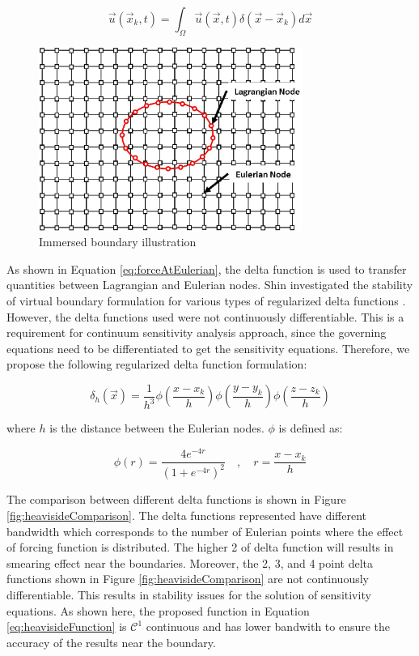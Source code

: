 \documentclass[12pt]{aiaa-pretty}
\begin{document}
%
\begin{equation}\label{eq:velocityAtLagrangian}
	\vec{u}(\vec{x}_k, t) = \int_\Omega \vec{u} (\vec{x}, t) \delta(\vec{x} - \vec{x}_k) d\vec{x}
\end{equation}
%

%
\begin{figure}[H]
	\centering
	\includegraphics[height=6.0cm]{figure/immerdBoundary.jpg}
	\caption{Immersed boundary illustration}
	\label{fig:immersedBoundary}
\end{figure}
%

As shown in Equation \eqref{eq:forceAtEulerian}, the delta function is used to transfer quantities between Lagrangian and Eulerian nodes. Shin investigated the stability of virtual boundary formulation for various types of regularized delta functions \cite{shin2008assessment}. However, the delta functions used were not continuously differentiable. This is a requirement for continuum sensitivity analysis approach, since the governing equations need to be differentiated to get the sensitivity equations. Therefore, we propose the following regularized delta function formulation:

%
\begin{equation}\label{eq:heavisideFunction}
	\delta_h(\vec{x}) = \frac{1}{h^3} \phi \left( \frac{x - x_k}{h} \right)
									 \phi \left( \frac{y - y_k}{h} \right)
									 \phi \left( \frac{z - z_k}{h} \right)
\end{equation}
%

where $h$ is the distance between the Eulerian nodes. $\phi$ is defined as:

%
\begin{equation}\label{eq:continuousDeltaFunction}
	\phi(r) = \frac{4 e^{-4 r}}{\left( 1 + e^{-4 r} \right)^2} \quad , \quad r = \frac{x - x_k}{h}
\end{equation}
%

The comparison between different delta functions is shown in Figure \ref{fig:heavisideComparison}. The delta functions represented have different bandwidth which corresponds to the number of Eulerian points where the effect of forcing function is distributed. The higher 2 of delta function will results in smearing effect near the boundaries. Moreover, the 2, 3, and 4 point delta functions shown in Figure \ref{fig:heavisideComparison} are not continuously differentiable. This results in stability issues for the solution of sensitivity equations. As shown here, the proposed function in Equation \eqref{eq:heavisideFunction} is $\mathcal{C}^1$ continuous and has lower bandwith to ensure the accuracy of the results near the boundary.
\end{document}
